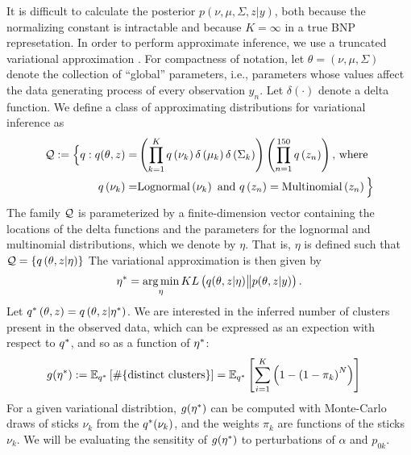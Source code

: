 %
It is difficult to calculate the posterior $p\left(\nu, \mu, \Sigma, z \vert
y\right)$, both because the normalizing constant is intractable and because
$K=\infty$ in a true BNP represetation. In order to perform approximate
inference, we use a truncated variational approximation
\citep{blei:2006:dirichletbnp}. For compactness of notation, let $\theta =
\left(\nu, \mu, \Sigma\right)$ denote the collection of ``global'' parameters,
i.e., parameters whose values affect the data generating process of every
observation $y_n$.   Let $\delta\left(\cdot\right)$ denote a delta function. We
define a class of approximating distributions for variational inference as
%
\begin{align*}
\mathcal{Q} := \Big\{ q:
q(\theta, z) = &
\left(\prod_{k=1}^{K}q\left(\nu_{k}\right)\delta\left(\mu_{k}\right)
    \delta\left(\Sigma_{k}\right)\right)
    \left(\prod_{n=1}^{150}q\left(z_{n}\right) \right)\textrm{, where } \\
q\left(\nu_{k}\right) =& \mathrm{Lognormal}\left(\nu_k\right) \textrm{ and }
q\left(z_n\right) = \mathrm{Multinomial}\left(z_n\right)
\Big\}
\end{align*}
%
The family $\mathcal{Q}$ is parameterized by a finite-dimension vector containing
the locations of the delta functions and the parameters for the lognormal and
multinomial distributions, which we denote by $\eta$.  That is, $\eta$ is
defined such that $\mathcal{Q} = \left\{q\left(\theta, z \vert \eta
\right)\right\}$ The variational approximation is then given by
%
\begin{align}
\eta^{*} = \operatorname*{arg\,min}_{\eta} KL\left(
    q(\theta, z \vert \eta) \big\| p(\theta, z | y)
    \right). \label{eq:kl_objective}
\end{align}
%
Let $q^{*}\left(\theta, z\right) = q\left(\theta, z \vert \eta^{*}\right)$.
We are interested in the inferred number of clusters present in the observed
data, which can be expressed as an expection with respect to $q^{*}$,
and so as a function of $\eta^{*}$:
%
\begin{align}
g(\eta^{*}) :=
\mathbb{E}_{q^{*}} \left[ \#\{\text{distinct clusters}\} \right]  &=
\mathbb{E}_{q^{*}} \left[\sum_{i=1}^K \left(1 - \left(1 - \pi_k\right)^N\right)
    \right]
    \label{eq:expected_num_clusters}
\end{align}
%
For a given variational distribtion, $g(\eta^{*})$ can be computed with
Monte-Carlo draws of sticks $\nu_k$ from the $q^{*}(\nu_k)$, and the weights $\pi_k$
are functions of the sticks $\nu_k$.
We will be evaluating the sensitity of $g(\eta^{*})$ to perturbations of
$\alpha$ and $p_{0k}$.
